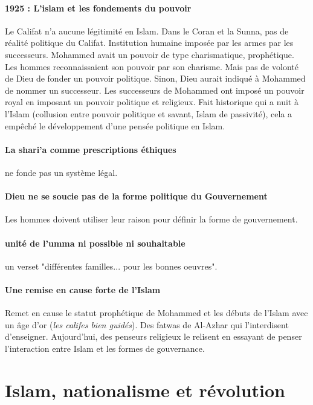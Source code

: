   \paragraph{1925 : L'islam et les fondements du pouvoir } Le Califat n'a aucune légitimité en Islam. Dans le Coran et la Sunna, pas de réalité politique du Califat. Institution humaine imposée par les armes par les successeurs. Mohammed avait un pouvoir de type charismatique, prophétique. Les hommes reconnaissaient son pouvoir par son charisme. Mais pas de volonté de Dieu de fonder un pouvoir politique. Sinon, Dieu aurait indiqué à Mohammed de nommer un successeur. Les successeurs de Mohammed ont imposé un pouvoir royal en imposant un pouvoir politique et religieux.  Fait historique qui a nuit à l'Islam (collusion entre pouvoir politique et savant, Islam de passivité), cela a empêché le développement d'une pensée politique en Islam. 
  
  \paragraph{La shari'a comme prescriptions éthiques} ne fonde pas un système légal.
  
  \paragraph{Dieu ne se soucie pas de la forme politique du Gouvernement}  Les hommes doivent utiliser leur raison pour définir la forme de gouvernement. 

  \paragraph{unité de l'umma ni possible ni souhaitable} un verset "différentes familles... pour les bonnes oeuvres".

\paragraph{Une remise en cause forte de l'Islam} Remet en cause le statut prophétique de Mohammed et les débuts de l'Islam avec un âge d'or (\textit{les califes bien guidés}). Des fatwas de Al-Azhar qui l'interdisent d'enseigner.  Aujourd'hui, des penseurs religieux le relisent en essayant de penser l'interaction entre Islam et les formes de gouvernance. 
 ~
  \hypertarget{islam-nationalisme-et-ruxe9volution}{%
  \section{\texorpdfstring{{Islam, nationalisme et
  révolution}}{Islam, nationalisme et révolution}}\label{islam-nationalisme-et-ruxe9volution}}


